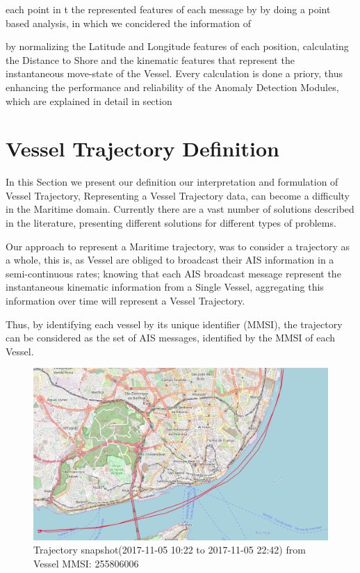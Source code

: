 each point in t the represented features of each message by by doing a point based analysis, in which we concidered the information of  

by normalizing the Latitude and Longitude features of each position, calculating the Distance to Shore and the kinematic features that represent the instantaneous move-state of the Vessel. Every calculation is done a priory, thus enhancing the performance and reliability of the Anomaly Detection Modules, which are explained in detail in section 

\section{Vessel Trajectory Definition}
In this Section we present our definition our interpretation and formulation of Vessel Trajectory, 
Representing a Vessel Trajectory data, can become a difficulty in the Maritime domain. Currently there are a vast number of solutions described in the literature, presenting different solutions for different types of problems. 

Our approach to represent a Maritime trajectory, was to consider a trajectory as a whole, this is, as Vessel are obliged to broadcast their AIS information in a semi-continuous rates; knowing that each AIS broadcast message represent the instantaneous kinematic information from a Single Vessel, aggregating this information over time will represent a Vessel Trajectory. 

Thus, by identifying each vessel by its unique identifier (MMSI), the trajectory can be considered as the set of AIS messages, identified by the MMSI of each Vessel.

\begin{figure}[H]
	\centering
	\includegraphics[scale = .3]{figures/Ch3/traj_example.png}
    \caption{Trajectory snapshot(2017-11-05 10:22 to 2017-11-05 22:42) from Vessel MMSI: 255806006}
    \label{fig: TrajectorySMM_example}
\end{figure}

